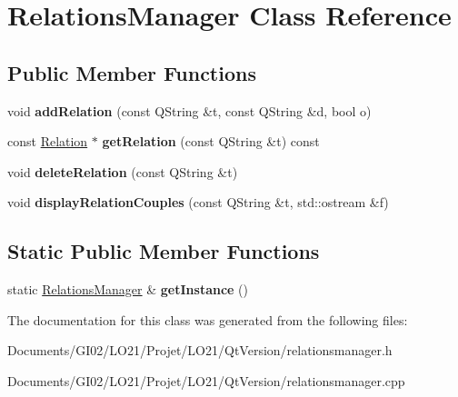 \hypertarget{class_relations_manager}{}\section{Relations\+Manager Class Reference}
\label{class_relations_manager}
\subsection*{Public Member Functions}
\begin{DoxyCompactItemize}
\item 
\mbox{\label{class_relations_manager_a8fd9802237ce57d8c0b295291bbcc134}} 
void {\bfseries add\+Relation} (const Q\+String \&t, const Q\+String \&d, bool o)
\item 
\mbox{\label{class_relations_manager_afa0aefdcdf5eb54e667b5fbe84c2cd47}} 
const \hyperlink{class_relation}{Relation} $\ast$ {\bfseries get\+Relation} (const Q\+String \&t) const
\item 
\mbox{\label{class_relations_manager_aff0b03fb4d5885befbe4a6bbab7cbcac}} 
void {\bfseries delete\+Relation} (const Q\+String \&t)
\item 
\mbox{\label{class_relations_manager_a644ef25d2a85209b8a402e416da21311}} 
void {\bfseries display\+Relation\+Couples} (const Q\+String \&t, std\+::ostream \&f)
\end{DoxyCompactItemize}
\subsection*{Static Public Member Functions}
\begin{DoxyCompactItemize}
\item 
\mbox{\label{class_relations_manager_a21bcc3976b29e50f8689d3c6658d9ce4}} 
static \hyperlink{class_relations_manager}{Relations\+Manager} \& {\bfseries get\+Instance} ()
\end{DoxyCompactItemize}


The documentation for this class was generated from the following files\+:\begin{DoxyCompactItemize}
\item 
Documents/\+G\+I02/\+L\+O21/\+Projet/\+L\+O21/\+Qt\+Version/relationsmanager.\+h\item 
Documents/\+G\+I02/\+L\+O21/\+Projet/\+L\+O21/\+Qt\+Version/relationsmanager.\+cpp\end{DoxyCompactItemize}
